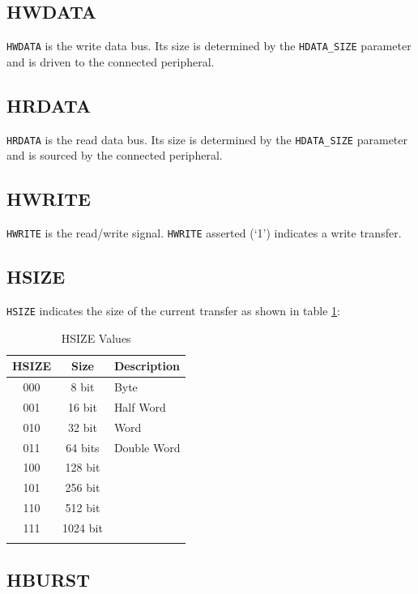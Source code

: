 \subsection{HWDATA}

\texttt{HWDATA} is the write data bus. Its size is determined by the
\texttt{HDATA\_SIZE} parameter and is driven to the connected
peripheral.

\subsection{HRDATA}

\texttt{HRDATA} is the read data bus. Its size is determined by the
\texttt{HDATA\_SIZE} parameter and is sourced by the connected
peripheral.

\subsection{HWRITE}

\texttt{HWRITE} is the read/write signal. \texttt{HWRITE} asserted (`1')
indicates a write transfer.

\subsection{HSIZE}

\texttt{HSIZE} indicates the size of the current transfer as shown in table \ref{tab:HSIZE}:

\begin{longtable}[c]{@{\extracolsep{\fill}}ccl}	
	\toprule 
	\textbf{HSIZE} & \textbf{Size} & \textbf{Description}\\
	\midrule
	\endhead 
	000 & 8 bit    & Byte\\
	001 & 16 bit   & Half Word\\
	010 & 32 bit   & Word\\
	011 & 64 bits  & Double Word\\
	100 & 128 bit  &\\
	101 & 256 bit  &\\
	110 & 512 bit  &\\
	111 & 1024 bit &\\
	\bottomrule 	
	\caption{HSIZE Values}
	\label{tab:HSIZE}
\end{longtable}

\subsection{HBURST}

